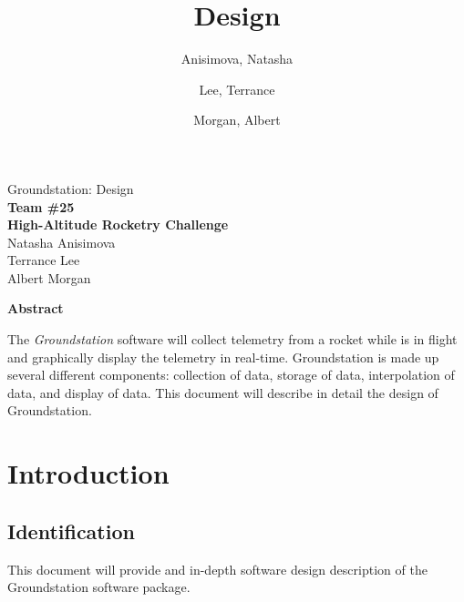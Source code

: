 \documentclass[10pt,draftclsnofoot,onecolumn]{IEEEtran}
\begin{document}
	\singlespace
	
	\title{\vspace{2in}Design}
	
	\author {
		Anisimova, Natasha
		\and
		Lee, Terrance
		\and
		Morgan, Albert
	}
	
	
	\pagestyle{empty}
	\vspace*{2in}
	\begin{center}
		\huge
		Groundstation: Design\\
		\normalsize
		\vspace{5mm}
		\textbf{
			Team \#25\\
			High-Altitude Rocketry Challenge\\
		}
		\vspace{1mm}
		Natasha Anisimova\\
		Terrance Lee\\
		Albert Morgan
	\end{center}
	
	\vspace{5mm}
	
	\begin{center}
		\textbf{Abstract}
	\end{center}
	
	
	The \textit{Groundstation} software will collect telemetry from a rocket while is in flight and graphically display the telemetry in real-time. Groundstation is made up several different components: collection of data, storage of data, interpolation of data, and 
	display of data.
	This document will describe in detail the design of Groundstation.
		
	\pagestyle{headings}
	
	\newpage

	\tableofcontents
	\newpage

	\section{Introduction}

	\subsection{Identification}
	This document will provide and in-depth software design description of the Groundstation software package.
	
\end{document}
